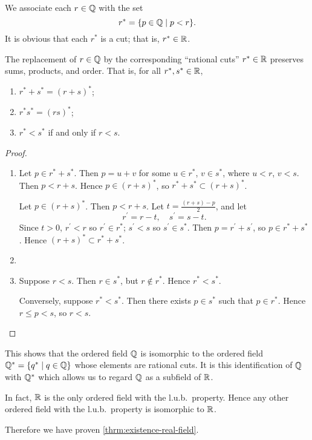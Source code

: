 We associate each $r\in\mathbb Q$ with the set
\[r^*=\{p\in\mathbb Q\mid p<r\}.\]
It is obvious that each $r^*$ is a cut; that is, $r^*\in\mathbb R$.

\begin{proposition}
The replacement of $r\in\mathbb Q$ by the corresponding ``rational cuts'' $r^*\in\mathbb R$ preserves sums, products, and order. That is, for all $r^*,s^*\in\mathbb R$,
\begin{enumerate}[label=(\roman*)]
\item $r^*+s^*=(r+s)^*$;
\item $r^*s^*=(rs)^*$;
\item $r^*<s^*$ if and only if $r<s$.
\end{enumerate}
\end{proposition}

\begin{proof} \
\begin{enumerate}[label=(\roman*)]
\item Let $p\in r^*+s^*$. Then $p=u+v$ for some $u\in r^*$, $v\in s^*$, where $u<r$, $v<s$. Then $p<r+s$. Hence $p\in(r+s)^*$, so $r^*+s^*\subset(r+s)^*$.

Let $p\in(r+s)^*$. Then $p<r+s$. Let $t=\frac{(r+s)-p}{2}$, and let
\[r^\prime=r-t,\quad s^\prime=s-t.\]
Since $t>0$, $r^\prime<r$ so $r^\prime\in r^*$; $s^\prime<s$ so $s^\prime\in s^*$. Then $p=r^\prime+s^\prime$, so $p\in r^*+s^*$. Hence $(r+s)^*\subset r^*+s^*$.

\item 
\item Suppose $r<s$. Then $r\in s^*$, but $r\notin r^*$. Hence $r^*<s^*$.

Conversely, suppose $r^*<s^*$. Then there exists $p\in s^*$ such that $p\in r^*$. Hence $r\le p<s$, so $r<s$.
\end{enumerate}
\end{proof}

This shows that the ordered field $\mathbb Q$ is isomorphic to the ordered field $\mathbb Q^*=\{q^*\mid q\in\mathbb Q\}$ whose elements are rational cuts. It is this identification of $\mathbb Q$ with $\mathbb Q^*$ which allows us to regard $\mathbb Q$ as a subfield of $\mathbb R$.

\begin{remark}
In fact, $\mathbb R$ is the only ordered field with the l.u.b.\ property. Hence any other ordered field with the l.u.b.\ property is isomorphic to $\mathbb R$.
\end{remark}

Therefore we have proven \ref{thrm:existence-real-field}.
\pagebreak

